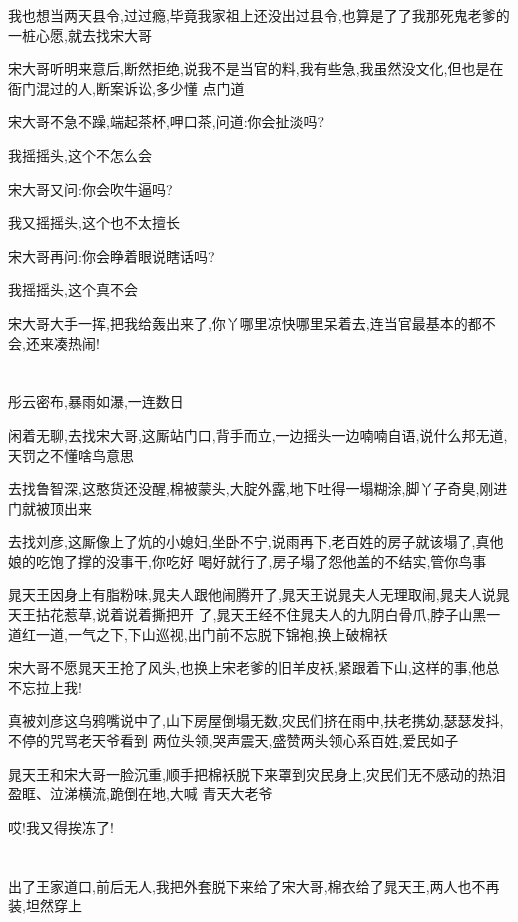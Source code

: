 ﻿\documentclass[12pt]{article}
\begin{document}
我也想当两天县令,过过瘾,毕竟我家祖上还没出过县令,也算是了了我那死鬼老爹的一桩心愿,就去找宋大哥

宋大哥听明来意后,断然拒绝,说我不是当官的料,我有些急,我虽然没文化,但也是在衙门混过的人,断案诉讼,多少懂
点门道

宋大哥不急不躁,端起茶杯,呷口茶,问道:你会扯淡吗?

我摇摇头,这个不怎么会

宋大哥又问:你会吹牛逼吗?

我又摇摇头,这个也不太擅长

宋大哥再问:你会睁着眼说瞎话吗?

我摇摇头,这个真不会

宋大哥大手一挥,把我给轰出来了,你丫哪里凉快哪里呆着去,连当官最基本的都不会,还来凑热闹!

\section{}

彤云密布,暴雨如瀑,一连数日

闲着无聊,去找宋大哥,这厮站门口,背手而立,一边摇头一边喃喃自语,说什么邦无道,天罚之\dldots 不懂啥鸟意思

去找鲁智深,这憨货还没醒,棉被蒙头,大腚外露,地下吐得一塌糊涂,脚丫子奇臭,刚进门就被顶出来\dldots

去找刘彦,这厮像上了炕的小媳妇,坐卧不宁,说雨再下,老百姓的房子就该塌了,真他娘的吃饱了撑的没事干,你吃好
喝好就行了,房子塌了怨他盖的不结实,管你鸟事\dldots

晁天王因身上有脂粉味,晁夫人跟他闹腾开了,晁天王说晁夫人无理取闹,晁夫人说晁天王拈花惹草,说着说着撕把开
了,晁天王经不住晁夫人的九阴白骨爪,脖子山黑一道红一道,一气之下,下山巡视,出门前不忘脱下锦袍,换上破棉袄

宋大哥不愿晁天王抢了风头,也换上宋老爹的旧羊皮袄,紧跟着下山,这样的事,他总不忘拉上我!

真被刘彦这乌鸦嘴说中了,山下房屋倒塌无数,灾民们挤在雨中,扶老携幼,瑟瑟发抖,不停的咒骂老天爷\dldots 看到
两位头领,哭声震天,盛赞两头领心系百姓,爱民如子\dldots

晁天王和宋大哥一脸沉重,顺手把棉袄脱下来罩到灾民身上,灾民们无不感动的热泪盈眶、泣涕横流,跪倒在地,大喊
青天大老爷\dldots

哎!我又得挨冻了! 

\section{}

出了王家道口,前后无人,我把外套脱下来给了宋大哥,棉衣给了晁天王,两人也不再装,坦然穿上
\end{document}
